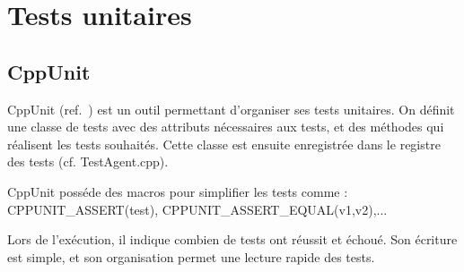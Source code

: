 \section{Tests unitaires}
\subsection{CppUnit}
CppUnit (ref.~\cite{CppUnit}) est un outil permettant d'organiser ses tests unitaires.
 On définit une classe de tests avec des attributs nécessaires aux tests, et des méthodes qui réalisent les tests souhaités. Cette classe est ensuite enregistrée dans le registre des tests (cf. TestAgent.cpp).

CppUnit posséde des macros pour simplifier les tests comme :
CPPUNIT\_ASSERT(test), CPPUNIT\_ASSERT\_EQUAL(v1,v2),...

Lors de l'exécution, il indique combien de tests ont réussit et échoué.
Son écriture est simple, et son organisation permet une lecture rapide des tests.


